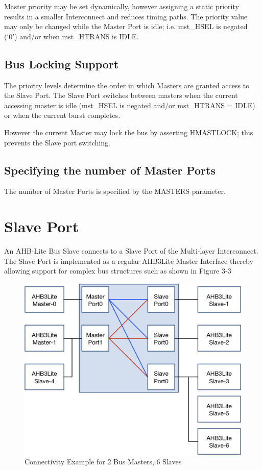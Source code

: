 Master priority may be set dynamically, however assigning a static
priority results in a smaller Interconnect and reduces timing paths. The
priority value may only be changed while the Master Port is idle; i.e.
mst\_HSEL is negated (`0') and/or when mst\_HTRANS is IDLE.

\subsection{Bus Locking Support}\label{bus-locking-support}

The priority levels determine the order in which Masters are granted
access to the Slave Port. The Slave Port switches between masters when
the current accessing master is idle (mst\_HSEL is negated and/or
mst\_HTRANS = IDLE) or when the current burst completes.

However the current Master may lock the bus by asserting HMASTLOCK; this
prevents the Slave port switching.

\subsection{Specifying the number of Master
Ports}\label{specifying-the-number-of-master-ports}

The number of Master Ports is specified by the MASTERS parameter.

\section{Slave Port}\label{slave-port}

An AHB-Lite Bus Slave connects to a Slave Port of the Multi-layer
Interconnect. The Slave Port is implemented as a regular AHB3Lite Master
Interface thereby allowing support for complex bus structures such as
shown in Figure 3‑3

\begin{figure}[tbh]
\includegraphics{assets/img/ahb-lite-switch-sys3.png}
\caption{Connectivity Example	for 2 Bus Masters, 6 Slaves}
\label{fig:ahb-lite-switch-sys1}
\end{figure}

